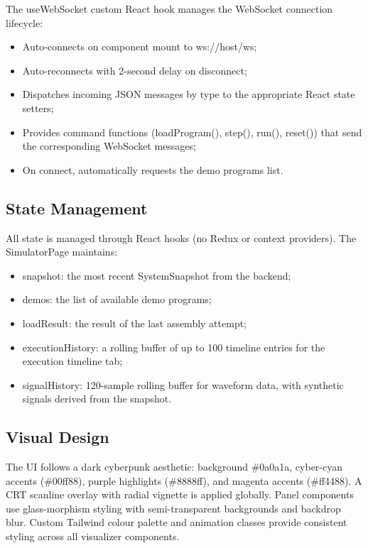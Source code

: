 \documentclass[12pt,a4paper,twoside]{book}
\theoremstyle{trinarytheorem}
\theoremstyle{trinarydefinition}
\newcommand{\code}[1]{\textsf{#1}}
\begin{document}
The \code{useWebSocket} custom React hook manages the WebSocket
connection lifecycle:
\begin{itemize}
    \item Auto-connects on component mount to \code{ws://host/ws};
    \item Auto-reconnects with 2-second delay on disconnect;
    \item Dispatches incoming JSON messages by type to the appropriate
          React state setters;
    \item Provides command functions (\code{loadProgram()},
          \code{step()}, \code{run()}, \code{reset()}) that
          send the corresponding WebSocket messages;
    \item On connect, automatically requests the demo programs list.
\end{itemize}

\subsection{State Management}

All state is managed through React hooks (no Redux or context providers).
The \code{SimulatorPage} maintains:
\begin{itemize}
    \item \code{snapshot}: the most recent \code{SystemSnapshot} from
          the backend;
    \item \code{demos}: the list of available demo programs;
    \item \code{loadResult}: the result of the last assembly attempt;
    \item \code{executionHistory}: a rolling buffer of up to 100
          timeline entries for the execution timeline tab;
    \item \code{signalHistory}: 120-sample rolling buffer for waveform
          data, with synthetic signals derived from the snapshot.
\end{itemize}

\subsection{Visual Design}

The UI follows a dark cyberpunk aesthetic: background \code{\#0a0a1a},
cyber-cyan accents (\code{\#00ff88}), purple highlights
(\code{\#8888ff}), and magenta accents (\code{\#ff4488}). A CRT
scanline overlay with radial vignette is applied globally. Panel
components use glass-morphism styling with semi-transparent backgrounds
and backdrop blur. Custom Tailwind colour palette and animation classes
provide consistent styling across all visualizer components.
\end{document}

